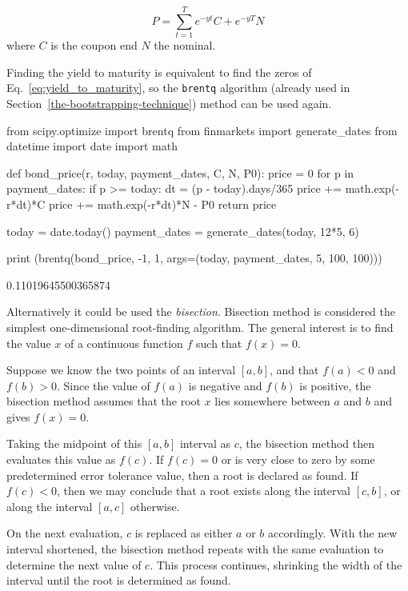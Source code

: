 \begin{equation}
P = \sum_{t=1}^T e^{-yt}C + e^{-yT}N 
\label{eq:yield_to_maturity}
\end{equation}
where $C$ is the coupon end $N$ the nominal.

Finding the yield to maturity is equivalent to find the zeros of Eq.~\ref{eq:yield_to_maturity}, so the \texttt{brentq} algorithm (already used in Section~\ref{the-bootstrapping-technique}) method can be used again.

\begin{ipython}
from scipy.optimize import brentq
from finmarkets import generate_dates
from datetime import date
import math 

def bond_price(r, today, payment_dates, C, N, P0):
    price = 0
    for p in payment_dates:
        if p >= today:
            dt = (p - today).days/365
            price += math.exp(-r*dt)*C
    price += math.exp(-r*dt)*N - P0
    return price
    
today = date.today()
payment_dates = generate_dates(today, 12*5, 6)

print (brentq(bond_price, -1, 1, args=(today, payment_dates, 5, 100, 100)))
\end{ipython}
\begin{ioutput}
0.11019645500365874
\end{ioutput}

Alternatively it could be used the \emph{bisection}. Bisection method is considered the simplest one-dimensional root-finding algorithm. The general interest is to find the value $x$ of a continuous function $f$ such that $f(x)= 0$.

Suppose we know the two points of an interval $[a,b]$, and that $f (a)\lt 0$ and $f(b)\gt 0$.
Since the value of $f(a)$ is negative and $f(b)$ is positive, the bisection method assumes that the root $x$ lies somewhere between $a$ and $b$ and gives $f(x) = 0$.

Taking the midpoint of this $[a, b]$ interval as $c$, the bisection method then evaluates this value as $f(c)$.
If $f(c) = 0$ or is very close to zero by some predetermined error tolerance value, then a root is declared as found. If $f(c)\lt 0$, then we may conclude that a root exists along the interval $[c, b]$, or along the interval $[a,c]$ otherwise.

On the next evaluation, $c$ is replaced as either $a$ or $b$ accordingly. With the new interval shortened, the bisection method repeats with the same evaluation to determine the next value of $c$. This process continues, shrinking the width of the interval until the root is determined as found.

